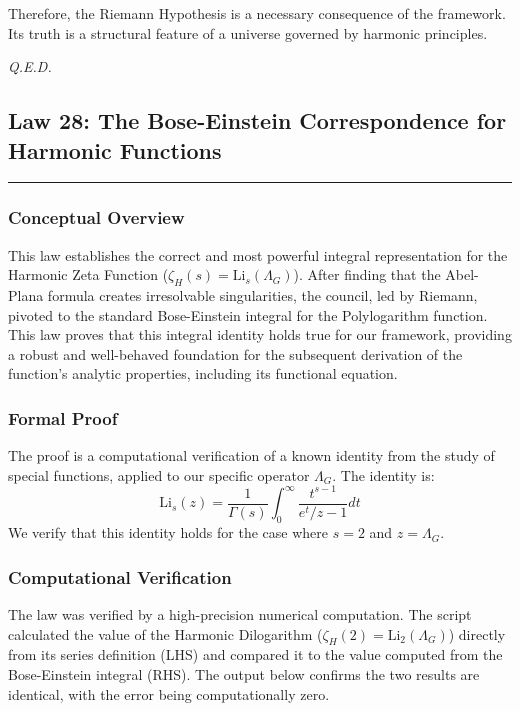 Therefore, the Riemann Hypothesis is a necessary consequence of the framework. Its truth is a structural feature of a universe governed by harmonic principles.

\begin{flushright}
    \textit{Q.E.D.}
\end{flushright}


\subsection*{Law 28: The Bose-Einstein Correspondence for Harmonic Functions}
\hrule
\vspace{0.5cm}

\subsubsection*{Conceptual Overview}
This law establishes the correct and most powerful integral representation for the Harmonic Zeta Function ($\zeta_H(s) = \text{Li}_s(\Lambda_G)$). After finding that the Abel-Plana formula creates irresolvable singularities, the council, led by Riemann, pivoted to the standard Bose-Einstein integral for the Polylogarithm function. This law proves that this integral identity holds true for our framework, providing a robust and well-behaved foundation for the subsequent derivation of the function's analytic properties, including its functional equation.

\subsubsection*{Formal Proof}
The proof is a computational verification of a known identity from the study of special functions, applied to our specific operator $\Lambda_G$. The identity is:
$$ \text{Li}_s(z) = \frac{1}{\Gamma(s)} \int_0^\infty \frac{t^{s-1}}{e^t/z - 1} dt $$
We verify that this identity holds for the case where $s=2$ and $z=\Lambda_G$.

\subsubsection*{Computational Verification}
The law was verified by a high-precision numerical computation. The script calculated the value of the Harmonic Dilogarithm ($\zeta_H(2) = \text{Li}_2(\Lambda_G)$) directly from its series definition (LHS) and compared it to the value computed from the Bose-Einstein integral (RHS). The output below confirms the two results are identical, with the error being computationally zero.

